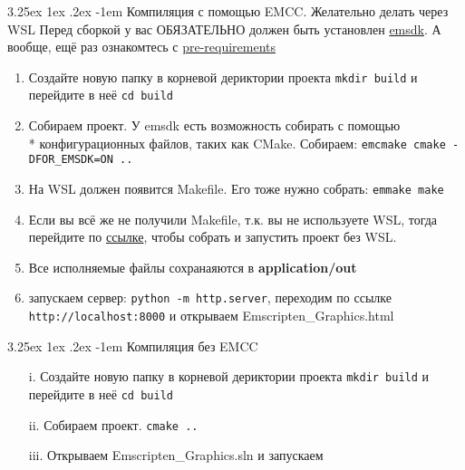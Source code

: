 \documentclass[12pt]{article}
\makeatletter
\renewcommand\paragraph{\@startsection{paragraph}{5}{\z@}%
  {3.25ex \@plus1ex \@minus.2ex}%
  {-1em}%
  {\normalfont\normalsize\bfseries}}
\makeatother
\begin{document}
\begin{enumerate}
\begin{tcolorbox}[colback=yellow!10!white,colframe=red!75!black,title=\textbf{Not Docker}]
\begin{enumerate}
            \paragraph{Компиляция с помощью EMCC. Желательно делать через WSL}
            Перед сборкой у вас ОБЯЗАТЕЛЬНО должен быть установлен \href{https://emscripten.org/docs/getting_started/downloads.html}{emsdk}.
            А вообще, ещё раз ознакомтесь с \hyperref[sec:pre_req]{pre-requirements}
            \begin{enumerate}
              \item Создайте новую папку в корневой дериктории проекта
              \colorbox{gray!25!}{\texttt{mkdir build}} и перейдите в неё 
              \colorbox{gray!25!}{\texttt{cd build}}
              \item Собираем проект. У emsdk есть возможность собирать с помощью\\*
              конфигурационных файлов, таких как CMake. Собираем:
              \colorbox{gray!25!}{\texttt{emcmake cmake -DFOR\_EMSDK=ON ..}}
              \item На WSL должен появится Makefile. Его тоже нужно собрать:
              \colorbox{gray!25!}{\texttt{emmake make}}
              \item Если вы всё же не получили Makefile, т.к. вы не используете
              WSL, тогда перейдите по \href{https://stackoverflow.com/questions/21387504/cmake-and-make-in-windows}{ссылке}, 
              чтобы собрать и запустить проект без WSL. 
              \item Все исполняемые файлы сохранаяются в \textbf{application/out}
              \item запускаем сервер: 
              \colorbox{gray!25!}{\texttt{python -m http.server}}, переходим
              по ссылке \colorbox{gray!25!}{\texttt{http://localhost:8000}} и открываем
              Emscripten\_Graphics.html
            \end{enumerate}  
          \end{enumerate}
        \end{tcolorbox}
        \begin{tcolorbox}[colback=yellow!10!white,colframe=red!75!black]
        \paragraph{Компиляция без EMCC}
            \begin{enumerate}
              \item[i.] Создайте новую папку в корневой дериктории проекта
              \colorbox{gray!25!}{\texttt{mkdir build}} и перейдите в неё 
              \colorbox{gray!25!}{\texttt{cd build}}
              \item[ii.] Собираем проект.
              \colorbox{gray!25!}{\texttt{cmake ..}}
              \item[iii.] Открываем Emscripten\_Graphics.sln и запускаем
            \end{enumerate}
        \end{tcolorbox}
    \end{enumerate}
\end{document}
